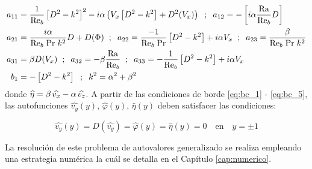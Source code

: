 \begin{align*}
a_{11} &= \frac{1}{\text{Re}_b} \left[ D^2 - k^2 \right]^2 - i \alpha \left( V_x \left[ D^2 - k^2 \right] + D^2(V_x)\right) \hspace{2mm} ; \hspace{2mm} a_{12} = -\left[ i \alpha \frac{\text{Ra}}{\text{Re}_b} D \right] \\
a_{21} &= \frac{i \alpha}{\text{Re}_b \hspace{1mm} \text{Pr} \hspace{1mm} k^2} D + D(\Phi) \hspace{2mm} ; \hspace{2mm} a_{22} = \frac{-1}{\text{Re}_b \hspace{1mm} \text{Pr} } \left[ D^2 - k^2 \right] + i \alpha V_x  \hspace{2mm} ; \hspace{2mm} a_{23} = \frac{\beta}{\text{Re}_b \hspace{1mm} \text{Pr} \hspace{1mm} k^2} \\
a_{31} &= \beta D(V_x) \hspace{2mm} ; \hspace{2mm} a_{32} = - \beta \frac{\text{Ra}}{\text{Re}_b}  \hspace{2mm} ; \hspace{2mm} a_{33} = -\frac{1}{\text{Re}_b} \left[ D^2 - k^2 \right] + i \alpha V_x \\
b_1    &= - \left[ D^2 - k^2 \right] \hspace{2mm} ; \hspace{2mm} k^2 = \alpha^2 + \beta^2 \\
\end{align*}
donde $\widehat{\eta} = \beta \hspace{0.5mm} \widehat{v_x} - \alpha \hspace{0.5mm} \widehat{v_z}$. A partir de las condiciones de borde \ref{eq:bc_1} - \ref{eq:bc_5}, las autofunciones $\widehat{v_y}(y)$, $\widehat{\varphi}(y)$, $\widehat{\eta}(y)$ deben satisfacer las condiciones:

\begin{equation}
\widehat{v_y}(y) = D(\widehat{v_y}) = \widehat{\varphi}(y) = \widehat{\eta}(y) = 0 \quad \text{en} \quad y= \pm 1
\label{eq:eigensis-ci}
\end{equation} 

La resolución de este problema de autovalores generalizado se realiza empleando una estrategia numérica la cuál se detalla en el Capítulo \ref{cap:numerico}. 


